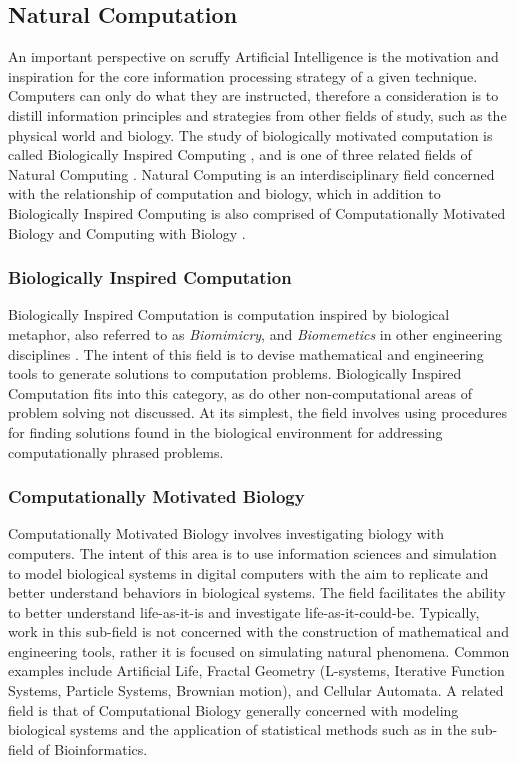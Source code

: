 \subsection{Natural Computation}
\label{sec:natural_computation}
An important perspective on scruffy Artificial Intelligence is the motivation and inspiration for the core information processing strategy of a given technique. Computers can only do what they are instructed, therefore a consideration is to distill information principles and strategies from other fields of study, such as the physical world and biology. The study of biologically motivated computation is called Biologically Inspired Computing \cite{Castro2005a}, and is one of three related fields of Natural Computing \cite{Forbes2000, Forbes2005, Paton1994}. 
Natural Computing is an interdisciplinary field concerned with the relationship of computation and biology, which in addition to Biologically Inspired Computing is also comprised of Computationally Motivated Biology and Computing with Biology \cite{Paun2005, Marrow2000}.

\subsubsection{Biologically Inspired Computation}
Biologically Inspired Computation is computation inspired by biological metaphor, also referred to as \emph{Biomimicry}, and \emph{Biomemetics} in other engineering disciplines \cite{Castro2005, Benyus1998}. The intent of this field is to devise mathematical and engineering tools to generate solutions to computation problems. Biologically Inspired Computation fits into this category, as do other non-computational areas of problem solving not discussed. At its simplest, the field involves using procedures for finding solutions found in the biological environment for addressing computationally phrased problems.

\subsubsection{Computationally Motivated Biology}
Computationally Motivated Biology involves investigating biology with computers. The intent of this area is to use information sciences and simulation to model biological systems in digital computers with the aim to replicate and better understand behaviors in biological systems. The field facilitates the ability to better understand life-as-it-is and investigate life-as-it-could-be. Typically, work in this sub-field is not concerned with the construction of mathematical and engineering tools, rather it is focused on simulating natural phenomena. Common examples include Artificial Life, Fractal Geometry (L-systems, Iterative Function Systems, Particle Systems, Brownian motion), and Cellular Automata. A related field is that of Computational Biology generally concerned with modeling biological systems and the application of statistical methods such as in the sub-field of Bioinformatics.

